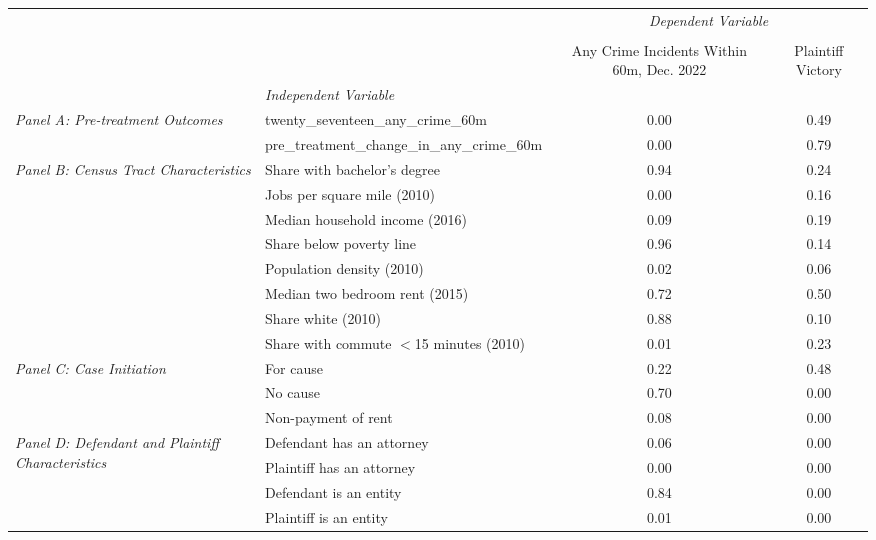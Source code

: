 \begin{tabular}{llcc}
\toprule
 &  & \multicolumn{2}{c}{\textit{Dependent Variable}} \\
\cline{3-4}
\\
 &  & Any Crime Incidents Within 60m, Dec. 2022 & Plaintiff Victory \\
 & \emph{Independent Variable} &  &  \\
\midrule
\multirow[c]{2}{3cm}{\textit{Panel A: Pre-treatment Outcomes}} & twenty_seventeen_any_crime_60m & 0.00 & 0.49 \\
 & pre_treatment_change_in_any_crime_60m & 0.00 & 0.79 \\
\cline{1-4}
\multirow[c]{8}{3cm}{\textit{Panel B: Census Tract Characteristics}} & Share with bachelor's degree & 0.94 & 0.24 \\
 & Jobs per square mile (2010) & 0.00 & 0.16 \\
 & Median household income (2016) & 0.09 & 0.19 \\
 & Share below poverty line & 0.96 & 0.14 \\
 & Population density (2010) & 0.02 & 0.06 \\
 & Median two bedroom rent (2015) & 0.72 & 0.50 \\
 & Share white (2010) & 0.88 & 0.10 \\
 & Share with commute $<$15 minutes (2010) & 0.01 & 0.23 \\
\cline{1-4}
\multirow[c]{3}{3cm}{\textit{Panel C: Case Initiation}} & For cause & 0.22 & 0.48 \\
 & No cause & 0.70 & 0.00 \\
 & Non-payment of rent & 0.08 & 0.00 \\
\cline{1-4}
\multirow[c]{4}{3cm}{\textit{Panel D: Defendant and Plaintiff Characteristics}} & Defendant has an attorney & 0.06 & 0.00 \\
 & Plaintiff has an attorney & 0.00 & 0.00 \\
 & Defendant is an entity & 0.84 & 0.00 \\
 & Plaintiff is an entity & 0.01 & 0.00 \\
\cline{1-4}
\bottomrule
\end{tabular}
